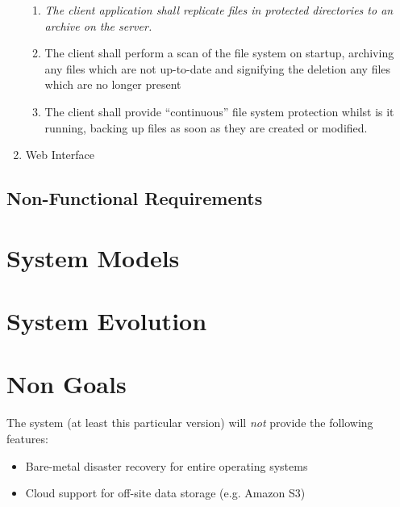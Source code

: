 \begin{enumerate}
        \begin{enumerate}
            \item \emph{The client application shall replicate files in
                protected directories to an archive on the server.}
            \item The client shall perform a scan of the file system on
                startup, archiving any files which are not up-to-date and
                signifying the deletion any files which are no longer present
            \item The client shall provide ``continuous'' file system
                protection whilst is it running, backing up files as soon as
                they are created or modified.
        \end{enumerate}
    \item Web Interface
\end{enumerate}

\subsection{Non-Functional Requirements}

\section{System Models}

\section{System Evolution}

\section{Non Goals}

The system (at least this particular version) will \emph{not} provide the
following features:

\begin{itemize}
    \item Bare-metal disaster recovery for entire operating systems
    \item Cloud support for off-site data storage (e.g. Amazon S3)
\end{itemize}
